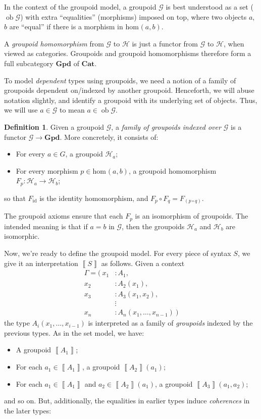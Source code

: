 \documentclass{article}
\theoremstyle{definition}
\newtheorem{definition}{Definition}[section]
\renewcommand{\int}[1]{\mathopen{}\left\llbracket #1
    \right\rrbracket\mathclose{}}       %
\newcommand{\Gpd}{\mathbf{Gpd}}
\newcommand{\Cat}{\mathbf{Cat}}
\newcommand{\G}{\mathcal{G}}
\newcommand{\Hh}{\mathcal{H}}
\DeclareMathOperator{\ob}{ob}
\renewcommand{\hom}[3][]{\mathrm{hom}_{#1}\mathopen{}\left( #2, #3 \right)\mathclose{}}
\DeclareMathOperator{\id}{id}				    %
\newcommand{\n}{%
}                %
\begin{document}
In the context of the groupoid model, a groupoid $\G$ is best understood as a set ($\ob \G$) with extra ``equalities'' (morphisms) imposed on top, where two objects $a$, $b$ are ``equal'' if there is a morphism in $\hom{a}{b}$.

A \textit{groupoid homomorphism} from $\G$ to $\Hh$ is just a functor from $\G$ to $\Hh$, when viewed as categories. Groupoids and groupoid homomorphisms therefore form a full subcategory $\Gpd$ of $\Cat$.

To model \textit{dependent} types using groupoids, we need a notion of a family of groupoids dependent on/indexed by another groupoid. Henceforth, we will abuse notation slightly, and identify a groupoid with its underlying set of objects. Thus, we will use $a \in \G$ to mean $a \in \ob\G$.

\begin{definition}
    Given a groupoid $\G$, a \textit{family of groupoids indexed over $\G$} is a functor $\G \to \Gpd$. More concretely, it consists of:
    \begin{itemize}
        \item For every $a \in G$, a groupoid $\Hh_a$;
        
        \item For every morphism $p \in \hom{a}{b}$, a groupoid homomorphism $F_p\colon \Hh_a \to \Hh_b$;
    \end{itemize}
    so that $F_{\id}$ is the identity homomorphism, and $F_p \circ F_q = F_{(p \circ q)}$.
\end{definition}

The groupoid axioms ensure that each $F_p$ is an isomorphism of groupoids. The intended meaning is that if $a=b$ in $\G$, then the groupoids $\Hh_a$ and $\Hh_b$ are isomorphic.

Now, we're ready to define the groupoid model. For every piece of syntax $S$, we give it an interpretation $\int{S}$ as follows. Given a context%
\begin{align*}
    \Gamma = \big(\
    x_1 &: A_1,\\
    x_2 &: A_2(x_1),\\
    x_3 &: A_3(x_1,x_2),\\
    &\mathrel{\vdots}\\
    x_n &: A_n(x_1,\ldots,x_{n-1})\ \big)
\end{align*}
the type $A_i(x_1,\ldots,x_{i-1})$ is interpreted as a family of \textit{groupoids} indexed by the previous types. As in the set model, we have:
\begin{itemize}
    \item A groupoid $\int{A_1}$;
    
    \item For each $a_1 \in \int{A_1}$, a groupoid $\int{A_2}\n(a_1)$;
    
    \item For each $a_1 \in \int{A_1}$ and $a_2 \in \int{A_2}\n(a_1)$, a groupoid $\int{A_3}\n(a_1,a_2)$;
\end{itemize}
and so on. But, additionally, the equalities in earlier types induce \textit{coherences} in the later types:
\end{document}

